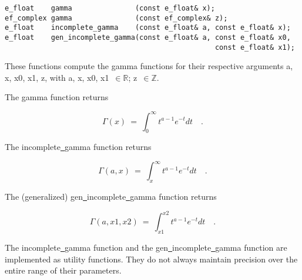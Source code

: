 \begin{lstlisting}
e_float    gamma               (const e_float& x);
ef_complex gamma               (const ef_complex& z);
e_float    incomplete_gamma    (const e_float& a, const e_float& x);
e_float    gen_incomplete_gamma(const e_float& a, const e_float& x0,
                                                  const e_float& x1);
\end{lstlisting}

\vspace{6.0pt}

 These functions compute the gamma functions
for their respective arguments {\courier a}, {\courier x}, {\courier x0},
{\courier x1}, {\courier z}, with
{\courier a}, {\courier x}, {\courier x0}, {\courier x1}~$\in\mathbb{R}$;
{\courier z}~$\in\mathbb{Z}$.

\vspace{6.0pt}

 The {\courier gamma} function
returns~\cite{wolframfunctions:website}

\begin{equation}
\Gamma(x) \ = \ \int_{0}^{\infty} t^{a-1} e^{-t} dt\quad.
\end{equation}

\vspace{6.0pt}

 The {\courier incomplete\underline\ gamma} function
returns~\cite{wolframfunctions:website}

\begin{equation}
\Gamma(a, x) \ = \ \int_{x}^{\infty} t^{a-1} e^{-t} dt\quad.
\end{equation}

 The (generalized) {\courier gen\underline\ incomplete\underline\ gamma}
function returns~\cite{wolframfunctions:website}

\begin{equation}
\Gamma(a, x1, x2) \ = \ \int_{x1}^{x2} t^{a-1} e^{-t} dt\quad.
\end{equation}

 The {\courier incomplete\underline\ gamma} function
and the {\courier gen\underline\ incomplete\underline\ gamma} function
are implemented as utility functions. They do not always maintain precision
over the entire range of their parameters.

\vspace{6.0pt}

